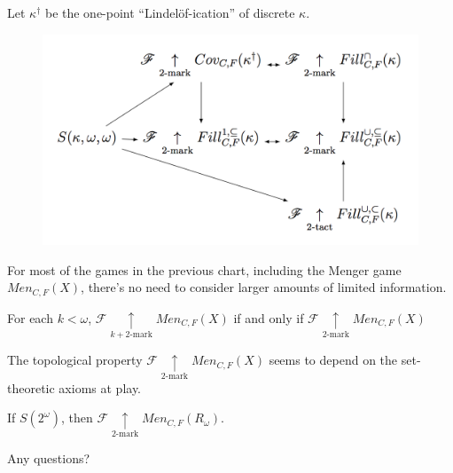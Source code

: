 \documentclass{beamer}
\theoremstyle{definition}
\newcommand{\kmarkwin}[1]{\underset{#1\text{-mark}}{\uparrow}}
\newcommand{\oneptlind}[1]{#1^\dagger}
\newcommand{\menGame}[1]{Men_{C,F}\left({#1}\right)}
\newcommand{\<}{\langle}
\renewcommand{\>}{\rangle}
\newcommand{\alcompS}[1]{S(#1)}
\newcommand{\pl}[1]{\mathscr{#1}}
\begin{document}
\begin{frame}
  Let $\oneptlind\kappa$ be the one-point ``Lindel\"of-ication'' of
  discrete $\kappa$.

  \begin{theorem}
    \begin{figure}
      \includegraphics[width=0.6\linewidth]{mengerGameChart.png}
    \end{figure}
  \end{theorem}
\end{frame}

\begin{frame}\small
  For most of the games in the previous chart, including the Menger game
  $\menGame{X}$, there's no need to consider larger amounts of limited
  information.

  \begin{theorem}
    For each $k<\omega$,
    $\pl F\kmarkwin{k+2}\menGame{X}$ if and only if
    $\pl F\kmarkwin2\menGame{X}$
  \end{theorem}

  The topological property $\pl F\kmarkwin2\menGame{X}$ seems to
  depend on the set-theoretic axioms at play.

  \begin{theorem}
    If $\alcompS{2^\omega}$, then $\pl F\kmarkwin2\menGame{R_\omega}$.
  \end{theorem}
\end{frame}


\begin{frame}[allowframebreaks]
  \tiny
  
  
\end{frame}

\begin{frame}
  Any questions?
\end{frame}
\end{document}
